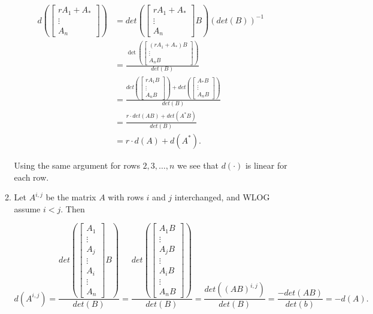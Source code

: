 \documentclass[12pt,oneside]{article}
\begin{document}
\begin{enumerate}
\begin{enumerate}[(1)]
\begin{align*}
d \left(   \left[ \begin{array}{c} rA_1+A_* \\ \vdots \\ A_n \end{array} \right] \right) &= det\left(\left[ \begin{array}{c} rA_1+A_*  \\ \vdots \\ A_n \end{array} \right] B \right) (det(B))^{-1} \\
& = \frac{\det\left(\left[ \begin{array}{c} (rA_1+A_*)B  \\ \vdots \\ A_nB \end{array} \right] \right)}{det(B)} \\
&=\frac{det\left( \left[ \begin{array}{c} rA_1B  \\ \vdots \\ A_nB \end{array} \right]\right)  +  det \left(\left[ \begin{array}{c}A_*B  \\ \vdots \\ A_nB \end{array} \right] \right) }{det(B)} \\
&= \frac{ r \cdot det \left( AB\right)+ det\left( A^*B\right) }{det(B)}\\
&=r\cdot d(A)+d(A^*).
\end{align*}

Using the same argument for rows \(2,3,\dots,n\) we see that \(d(\cdot)\) is linear for each row.

\item Let \(A^{i,j}\) be the matrix \(A\)  with rows \(i\) and \(j\) interchanged, and WLOG assume \(i < j\). Then

$$
d(A^{i,j})
=\frac{det \left( \left[  \begin{array}{c} A_1 \\ \vdots \\ A_j \\ \vdots \\ A_i \\ \vdots \\ A_n \end{array} \right]B \right) }{det(B)}  
=\frac{ det \left( \left[  \begin{array}{c} A_1B \\ \vdots \\ A_jB \\ \vdots \\ A_iB \\ \vdots \\ A_nB \end{array} \right] \right)  }{det(B)}  
=\frac{det\left( (AB)^{i,j}\right)}{det(B)}=\frac{-det(AB)}{det(b)}=-d(A).
$$





\end{enumerate}
\end{enumerate}
\end{document}
